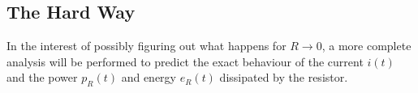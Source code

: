 \subsection{The Hard Way}

In the  interest  of  possibly  figuring out what happens for $R\to 0$, a more
complete  analysis  will  be  performed  to predict the exact behaviour of the
current  $i(t)$ and the power $p_R(t)$ and energy $e_R(t)$ dissipated  by  the
resistor.


\newpage
